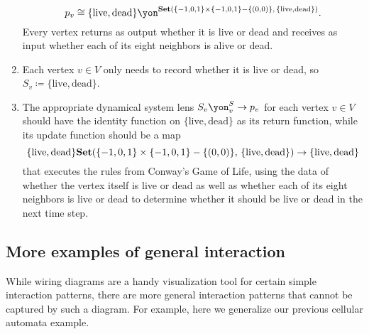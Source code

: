 \documentclass[Book-Poly]{subfiles}
\begin{document}
\begin{exercise}
\begin{solution}
\begin{enumerate}
    \[
        p_v\iso\{\text{live},\text{dead}\}\yon^{\smset(\{-1,0,1\}\times\{-1,0,1\}-\{(0,0)\},\, \{\text{live},\text{dead}\})}.
    \]
    Every vertex returns as output whether it is live or dead and receives as input whether each of its eight neighbors is alive or dead.
    \item Each vertex $v\in V$ only needs to record whether it is live or dead, so $S_v\coloneqq\{\text{live},\text{dead}\}$.
    \item The appropriate dynamical system lens $S_v\yon^S_v\to p_v$ for each vertex $v\in V$ should have the identity function on $\{\text{live},\text{dead}\}$ as its return function, while its update function should be a map
    \[
        \{\text{live},\text{dead}\}\mathbf{Set}(\{-1,0,1\}\times\{-1,0,1\}-\{(0,0)\},\, \{\text{live},\text{dead}\})\to\{\text{live},\text{dead}\}
    \]
    that executes the rules from Conway's Game of Life, using the data of whether the vertex itself is live or dead as well as whether each of its eight neighbors is live or dead to determine whether it should be live or dead in the next time step.
\end{enumerate}
\end{solution}
\end{exercise}


\subsection{More examples of general interaction}

While wiring diagrams are a handy visualization tool for certain simple interaction patterns, there are more general interaction patterns that cannot be captured by such a diagram.
For example, here we generalize our previous cellular automata example.
\end{document}
